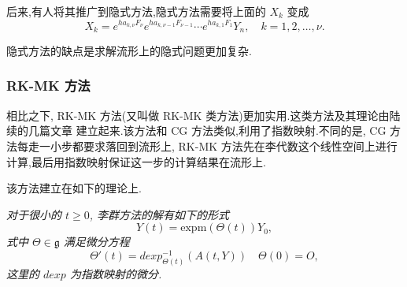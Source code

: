 后来,有人将其推广到隐式方法,隐式方法需要将上面的 $X_k$ 变成
\begin{equation*}
	X_k=e^{ha_{k,\nu}F_{\nu}}e^{ha_{k,\nu-1}F_{\nu-1}}\cdots e^{ha_{k,1}F_{1}}Y_n,\quad k=1,2,\ldots,\nu.
\end{equation*}

隐式方法的缺点是求解流形上的隐式问题更加复杂.

\subsubsection{RK-MK 方法}
相比之下, RK-MK 方法(又叫做 RK-MK 类方法)更加实用.这类方法及其理论由陆续的几篇文章 \cite{mk1996lie,mk1997numerical,mk1998runge,mk1999high} 建立起来.该方法和 CG 方法类似,利用了指数映射.不同的是, CG 方法每走一小步都要求落回到流形上, RK-MK 方法先在李代数这个线性空间上进行计算,最后用指数映射保证这一步的计算结果在流形上.

该方法建立在如下的理论上.
\begin{theorem}
	\emph{对于很小的 $t\geq 0$, 李群方法的解有如下的形式
	\begin{equation*}
		Y(t)=\mbox{expm}(\Theta(t))Y_0,
	\end{equation*}
	式中 $\Theta \in \mathfrak{g}$ 满足微分方程
	\begin{equation*}
		\Theta'(t)=dexp_{\Theta(t)}^{-1}(A(t,Y))\quad \Theta(0)=O,
	\end{equation*}
	这里的 $dexp$ 为指数映射的微分.}
\end{theorem}

